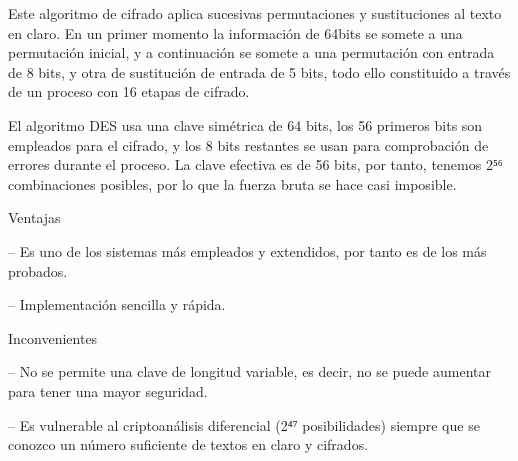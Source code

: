 \documentclass[12pt]{article}
\begin{document}
\vspace{\baselineskip}
\begin{justify}
Este algoritmo de cifrado aplica sucesivas permutaciones y sustituciones al texto en claro. En un primer momento la información de 64bits se somete a una permutación inicial, y a continuación se somete a una permutación con entrada de 8 bits, y otra de sustitución de entrada de 5 bits, todo ello constituido a través de un proceso con 16 etapas de cifrado.
\end{justify}\par


\vspace{\baselineskip}
\begin{justify}
El algoritmo DES usa una clave simétrica de 64 bits, los 56 primeros bits son empleados para el cifrado, y los 8 bits restantes se usan para comprobación de errores durante el proceso. La clave efectiva es de 56 bits, por tanto, tenemos 2⁵⁶ combinaciones posibles, por lo que la fuerza bruta se hace casi imposible.
\end{justify}\par


\vspace{\baselineskip}
\begin{justify}
Ventajas
\end{justify}\par

\begin{justify}
– Es uno de los sistemas más empleados y extendidos, por tanto es de los más probados.
\end{justify}\par

\begin{justify}
– Implementación sencilla y rápida.
\end{justify}\par


\vspace{\baselineskip}
\begin{justify}
Inconvenientes
\end{justify}\par

\begin{justify}
– No se permite una clave de longitud variable, es decir, no se puede aumentar para tener una mayor seguridad.
\end{justify}\par

\begin{justify}
– Es vulnerable al criptoanálisis diferencial (2⁴⁷ posibilidades) siempre que se conozco un número suficiente de textos en claro y cifrados.
\end{justify}\par
\end{document}
